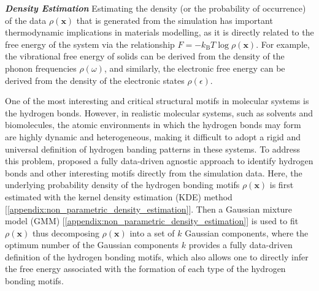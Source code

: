 \textbf{\textit{Density Estimation}} Estimating the density (or the probability of occurrence) of the data $\rho(\bm{x})$ that is generated from the simulation has important thermodynamic implications in materials modelling, as it is directly related to the free energy of the system via the relationship $F=-k_{\mathrm{B}}T\log \rho(\bm{x})$. For example, the vibrational free energy of solids can be derived from the density of the phonon frequencies $\rho(\omega)$, and similarly, the electronic free energy can be derived from the density of the electronic states $\rho(\epsilon)$. 

One of the most interesting and critical structural motifs in molecular systems is the hydrogen bonds. However, in realistic molecular systems, such as solvents and biomolecules, the atomic environments in which the hydrogen bonds may form are highly dynamic and heterogeneous, making it difficult to adopt a rigid and universal definition of hydrogen banding patterns in these systems. To address this problem, \citet{gasparotto2014recognizing} proposed a fully data-driven agnostic approach to identify hydrogen bonds and other interesting motifs\cite{gasparotto2018recognizing} directly from the simulation data. Here, the underlying probability density of the hydrogen bonding motifs $\rho(\bm{x})$ is first estimated with the kernel density estimation (KDE) method [\cref{appendix:non_parametric_density_estimation}]. Then a Gaussian mixture model (GMM) [\cref{appendix:non_parametric_density_estimation}] is used to fit $\rho(\bm{x})$ thus decomposing $\rho(\bm{x})$ into a set of $k$ Gaussian components, where the optimum number of the Gaussian components $k$ provides a fully data-driven definition of the hydrogen bonding motifs, which also allows one to directly infer the free energy associated with the formation of each type of the hydrogen bonding motifs.

